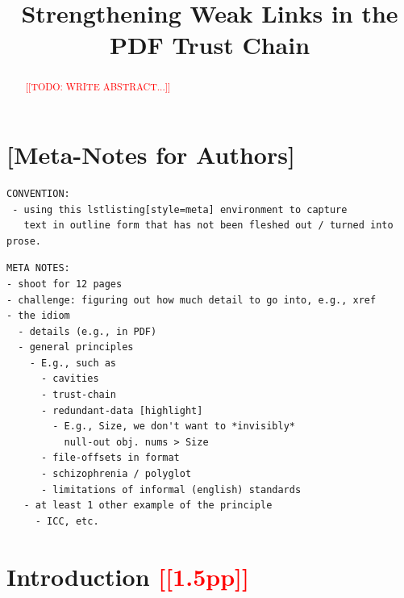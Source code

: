 \documentclass[conference,12pt]{IEEEtran}
\newcommand{\note}[1]{\noteYes{#1}}
\newcommand{\noteYes}[1]{\textcolor{red}{[[#1]]}}
\newcommand{\todo}[1]{\note{TODO: #1}}
\begin{document}
\date{}

\title{Strengthening Weak Links in the PDF Trust Chain}

\author{
     \and
}

\maketitle

\begin{abstract}

\todo{WRITE ABSTRACT...}
  
\end{abstract}

\section{[Meta-Notes for Authors]}

\begin{lstlisting}[style=meta]
CONVENTION:
 - using this lstlisting[style=meta] environment to capture
   text in outline form that has not been fleshed out / turned into prose.
\end{lstlisting}

\begin{lstlisting}[style=meta]
META NOTES:  
- shoot for 12 pages
- challenge: figuring out how much detail to go into, e.g., xref
- the idiom
  - details (e.g., in PDF)
  - general principles
    - E.g., such as
      - cavities
      - trust-chain 
      - redundant-data [highlight]
        - E.g., Size, we don't want to *invisibly*
          null-out obj. nums > Size
      - file-offsets in format
      - schizophrenia / polyglot
      - limitations of informal (english) standards
   - at least 1 other example of the principle
     - ICC, etc.
\end{lstlisting}

\section{Introduction \note{1.5pp}}
\label{sec:intro}
\end{document}
